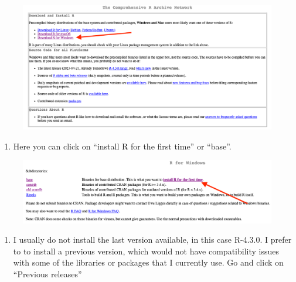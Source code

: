 \documentclass[
  letterpaper,
  DIV=11,
  numbers=noendperiod]{scrartcl}
\providecommand{\tightlist}{%
  \setlength{\itemsep}{0pt}\setlength{\parskip}{0pt}}\usepackage{longtable,booktabs,array}
\begin{document}
\begin{figure}[H]

{\centering \includegraphics[width=6.77083in,height=\textheight]{Fig3.png}

}

\end{figure}

\begin{enumerate}
\def\labelenumi{\arabic{enumi}.}
\setcounter{enumi}{3}
\tightlist
\item
  Here you can click on ``install R for the first time'' or ``base''.
\end{enumerate}

\begin{figure}[H]

{\centering \includegraphics[width=6.77083in,height=\textheight]{fig4.png}

}

\end{figure}

\begin{enumerate}
\def\labelenumi{\arabic{enumi}.}
\setcounter{enumi}{4}
\tightlist
\item
  I usually do not install the last version available, in this case
  R-4.3.0. I prefer to to install a previous version, which would not
  have compatibility issues with some of the libraries or packages that
  I currently use. Go and click on ``Previous releases''
\end{enumerate}
\end{document}
